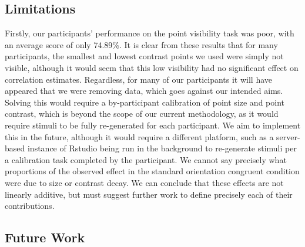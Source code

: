 \documentclass[manuscript, review, anonymous, screen]{acmart}
\begin{document}
\hypertarget{sec-limitations}{%
\subsection{Limitations}\label{sec-limitations}}

Firstly, our participants' performance on the point visibility task was
poor, with an average score of only 74.89\%. It is clear from these
results that for many participants, the smallest and lowest contrast
points we used were simply not visible, although it would seem that this
low visibility had no significant effect on correlation estimates.
Regardless, for many of our participants it will have appeared that we
were removing data, which goes against our intended aims. Solving this
would require a by-participant calibration of point size and point
contrast, which is beyond the scope of our current methodology, as it
would require stimuli to be fully re-generated for each participant. We
aim to implement this in the future, although it would require a
different platform, such as a server-based instance of Rstudio being run
in the background to re-generate stimuli per a calibration task
completed by the participant. We cannot say precisely what proportions
of the observed effect in the standard orientation congruent condition
were due to size or contrast decay. We can conclude that these effects
are not linearly additive, but must suggest further work to define
precisely each of their contributions.

\hypertarget{sec-future-work}{%
\subsection{Future Work}\label{sec-future-work}}
\end{document}
